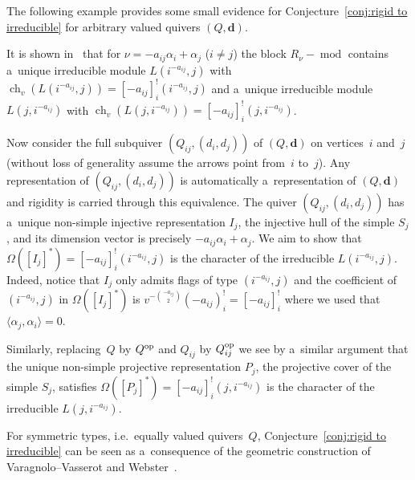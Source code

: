 \documentclass[pdftex]{sigma}
\numberwithin{equation}{section}
\begin{document}
The following example provides some small evidence for Conjecture~\ref{conj:rigid to irreducible} for arbitrary valued quivers $(Q,\mathbf{d})$.
\begin{Example}
It is shown in~\cite[Theorem 6.10]{lauda-vazirani} that for $\nu=-a_{ij}\alpha_i+\alpha_j$ ($i\ne j$) the block
$R_\nu-\operatorname{mod}$ contains a~unique irreducible module $L(i^{-a_{ij}},j)$ with
$\operatorname{ch}_v(L(i^{-a_{ij}},j))=[-a_{ij}]_i^!(i^{-a_{ij}},j)$ and a~unique irreducible module $L(j,i^{-a_{ij}})$
with $\operatorname{ch}_v(L(j,i^{-a_{ij}}))=[-a_{ij}]_i^!(j,i^{-a_{ij}})$.

Now consider the full subquiver $(Q_{ij},(d_i,d_j))$ of $(Q,\mathbf{d})$ on vertices~$i$ and~$j$ (without loss of
generality assume the arrows point from~$i$ to~$j$).
Any representation of $(Q_{ij},(d_i,d_j))$ is automatically a~representation of $(Q,\mathbf{d})$ and rigidity is carried
through this equivalence.
The quiver $(Q_{ij},(d_i,d_j))$ has a~unique non-simple injective representation $I_j$, the injective hull of the simple
$S_j$, and its dimension vector is precisely $-a_{ij}\alpha_i+\alpha_j$.
We aim to show that $\Omega([I_j]^*)=[-a_{ij}]_i^!(i^{-a_{ij}},j)$ is the character of the irreducible
$L(i^{-a_{ij}},j)$.
Indeed, notice that $I_j$ only admits f\/lags of type $(i^{-a_{ij}},j)$ and the coef\/f\/icient of $(i^{-a_{ij}},j)$ in
$\Omega([I_j]^*)$ is $v^{-{-a_{ij}\choose 2}}(-a_{ij})_i^!=[-a_{ij}]_i^!$ where we used that  %
$\langle\alpha_j,\alpha_i\rangle=0$.

Similarly, replacing~$Q$ by $Q^{\rm op}$ and $Q_{ij}$ by $Q_{ij}^{\rm op}$ we see by a~similar argument that the unique
non-simple projective representation $P_j$, the projective cover of the simple $S_j$, satisf\/ies
$\Omega([P_j]^*)=[-a_{ij}]_i^!(j,i^{-a_{ij}})$ is the character of the irreducible $L(j,i^{-a_{ij}})$.
\end{Example}

For symmetric types, i.e.~equally valued quivers~$Q$, Conjecture~\ref{conj:rigid to irreducible} can be seen as
a~consequence of the geometric construction of Varagnolo--Vasserot and Webster~\cite{varagnolo-vasserot,webster}.
\end{document}
